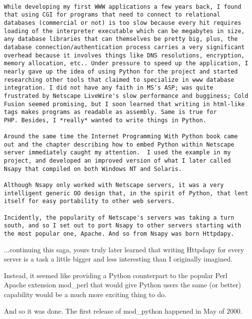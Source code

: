 \begin{verbatim}

While developing my first WWW applications a few years back, I found
that using CGI for programs that need to connect to relational
databases (commercial or not) is too slow because every hit requires
loading of the interpreter executable which can be megabytes in size,
any database libraries that can themselves be pretty big, plus, the
database connection/authentication process carries a very significant
overhead because it involves things like DNS resolutions, encryption,
memory allocation, etc.. Under pressure to speed up the application, I
nearly gave up the idea of using Python for the project and started
researching other tools that claimed to specialize in www database
integration. I did not have any faith in MS's ASP; was quite
frustrated by Netscape LiveWire's slow performance and bugginess; Cold
Fusion seemed promising, but I soon learned that writing in html-like
tags makes programs as readable as assembly. Same is true for
PHP. Besides, I *really* wanted to write things in Python.

Around the same time the Internet Programming With Python book came
out and the chapter describing how to embed Python within Netscape
server immediately caught my attention.  I used the example in my
project, and developed an improved version of what I later called
Nsapy that compiled on both Windows NT and Solaris.

Although Nsapy only worked with Netscape servers, it was a very
intelligent generic OO design that, in the spirit of Python, that lent
itself for easy portability to other web servers.

Incidently, the popularity of Netscape's servers was taking a turn
south, and so I set out to port Nsapy to other servers starting with
the most popular one, Apache. And so from Nsapy was born Httpdapy.

\end{verbatim}

  ...continuing this saga, yours truly later learned that writing
  Httpdapy for every server is a task a little bigger and less
  interesting than I originally imagined.

  Instead, it seemed like providing a Python counterpart to the
  popular Perl Apache extension mod_perl that would give Python users
  the same (or better) capability would be a much more exciting thing
  to do.

  And so it was done. The first release of mod_python happened in May
  of 2000.

